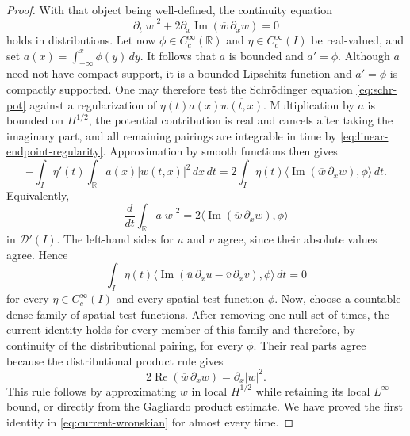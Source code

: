 \documentclass[11pt]{amsart}
\theoremstyle{remark}
\newcommand{\R}{\mathbb R}
\newcommand{\D}{\mathcal D}
\newcommand{\1}{\mathbf 1}
\begin{document}
\begin{proof}
With that object being well-defined, the continuity equation
\[
 \partial_t|w|^2+2\partial_x\operatorname{Im}(\overline w\,\partial_xw)=0
 \tag{1.7}\label{eq:continuity-general}
\]
holds in distributions. Let now $\phi\in C_c^\infty(\R)$ and
$\eta\in C_c^\infty(I)$ be real-valued, and set
$a(x)=\int_{-\infty}^x\phi(y)\,dy$. It follows that $a$ is bounded and $a'=\phi$. Although $a$ need not have compact support, it is a bounded Lipschitz function and $a'=\phi$ is compactly supported.  One may therefore test the
 Schr\"odinger equation \eqref{eq:schr-pot} against a regularization of
$\eta(t)a(x)\overline{w(t,x)}$.  Multiplication by $a$ is bounded on
$H^{1/2}$, the potential contribution is real and cancels after taking the
imaginary part, and all remaining pairings are integrable in time by
\eqref{eq:linear-endpoint-regularity}.  Approximation by smooth functions
then gives
\[
 -\int_I\eta'(t)\int_\R a(x)|w(t,x)|^2\,dx\,dt
 =2\int_I\eta(t)
 \langle\operatorname{Im}(\overline w\,\partial_xw),\phi\rangle\,dt.
\]
Equivalently,
\[
 \frac d{dt}\int_\R a|w|^2
 =2\langle\operatorname{Im}(\overline w\,\partial_xw),\phi\rangle
 \tag{1.8}\label{eq:localized-continuity-general}
\]
in $\D'(I)$.  The left-hand sides for $u$ and $v$ agree, since their absolute values agree.  Hence
\[
 \int_I\eta(t)
 \langle\operatorname{Im}(\overline u\,\partial_xu-\overline v\,\partial_xv),\phi\rangle\,dt=0
\]
for every $\eta\in C_c^\infty(I)$ and every spatial test function $\phi$. Now, choose a countable dense family of spatial test functions.  After removing
one null set of times, the current identity holds for every member of this
family and therefore, by continuity of the distributional pairing, for every
$\phi$.  Their real parts agree because the distributional product rule gives
\[
 2\operatorname{Re}(\overline w\,\partial_xw)=\partial_x|w|^2.
\]
This rule follows by approximating $w$ in local $H^{1/2}$ while retaining its
local $L^\infty$ bound, or directly from the Gagliardo product estimate.  We
have proved the first identity in \eqref{eq:current-wronskian} for almost every
time.


\end{proof}
\end{document}
